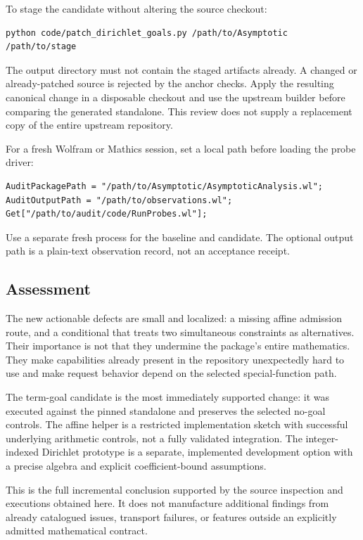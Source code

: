\documentclass[11pt,letterpaper]{article}
\begin{document}
To stage the candidate without altering the source checkout:
\begin{lstlisting}
python code/patch_dirichlet_goals.py /path/to/Asymptotic /path/to/stage
\end{lstlisting}
The output directory must not contain the staged artifacts already. A changed
or already-patched source is rejected by the anchor checks. Apply the resulting
canonical change in a disposable checkout and use the upstream builder before
comparing the generated standalone. This review does not supply a replacement
copy of the entire upstream repository.

For a fresh Wolfram or Mathics session, set a local path before loading the
probe driver:
\begin{lstlisting}
AuditPackagePath = "/path/to/Asymptotic/AsymptoticAnalysis.wl";
AuditOutputPath = "/path/to/observations.wl";
Get["/path/to/audit/code/RunProbes.wl"];
\end{lstlisting}
Use a separate fresh process for the baseline and candidate. The optional
output path is a plain-text observation record, not an acceptance receipt.

\subsection{Assessment}
The new actionable defects are small and localized: a missing affine admission
route, and a conditional that treats two simultaneous constraints as alternatives.
Their importance is not that they undermine the package's entire mathematics.
They make capabilities already present in the repository unexpectedly hard to
use and make request behavior depend on the selected special-function path.

The term-goal candidate is the most immediately supported change: it was
executed against the pinned standalone and preserves the selected no-goal
controls. The affine helper is a restricted implementation sketch with
successful underlying arithmetic controls, not a fully validated integration.
The integer-indexed Dirichlet prototype is a separate, implemented development
option with a precise algebra and explicit coefficient-bound assumptions.

This is the full incremental conclusion supported by the source inspection
and executions obtained here. It does not manufacture additional findings from
already catalogued issues, transport failures, or features outside an explicitly
admitted mathematical contract.
\end{document}
